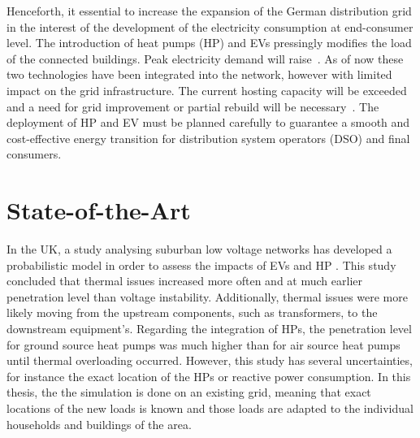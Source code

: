 Henceforth, it essential to increase the expansion of the German distribution grid in the interest of the development of the electricity consumption at end-consumer level. The introduction of heat pumps (HP) and EVs pressingly modifies the load of the connected buildings. Peak electricity demand will raise~\cite{ior}. As of now these two technologies have been integrated into the network, however with limited impact on the grid infrastructure. The current hosting capacity will be exceeded and a need for grid improvement or partial rebuild will be necessary~\cite{Ismael_AbdelAleem_Abdelaziz_Zobaa_2019}.
The deployment of HP and EV must be planned carefully to guarantee a smooth and cost-effective energy transition for distribution system operators (DSO) and final consumers. 


\section{State-of-the-Art}

 In the UK, a study analysing suburban low voltage networks has developed a probabilistic model in order to assess the impacts of EVs and HP \cite{navarro-espinosa_probabilistic_2014}. This study concluded that thermal issues increased more often and at much earlier penetration level than voltage instability. Additionally, thermal issues were more likely moving from the upstream components, such as transformers, to the downstream equipment's. Regarding the integration of HPs, the penetration level for ground source heat pumps was much higher than for air source heat pumps until thermal overloading occurred. However, this study has several uncertainties, for instance the exact location of the HPs or reactive power consumption. In this thesis, the the simulation is done on an existing grid, meaning that exact locations of the new loads is known and those loads are adapted to the individual households and buildings of the area. 

